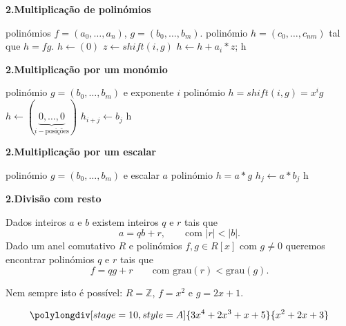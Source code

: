 \documentclass[handout]{beamer}
\newcommand{\ZZ}{\mathbb Z}
\newcommand{\grau}[1]{\mathrm{grau}({#1})}
\begin{document}
\begin{frame}[fragile]{\bf 2.}{\bf Multiplicação de polinómios}
\begin{algorithmic}
\REQUIRE polinómios $f=(a_0,\ldots, a_n)$, $g=(b_0,\ldots, b_m)$.
\ENSURE polinómio $h=(c_0, \ldots, c_{nm})$ tal que $h=fg$.
\STATE $h \leftarrow (0)$ 
  \STATE $z \leftarrow shift(i,g)$
  \STATE $h \leftarrow h + a_i*z$;
\ENDFOR
\RETURN h
\end{algorithmic}

\end{frame}

\begin{frame}[fragile]{\bf 2.}{\bf Multiplicação por um monómio}
\begin{algorithmic}
\REQUIRE polinómio $g=(b_0,\ldots, b_m)$ e exponente $i$
\ENSURE polinómio $h=shift(i,g) = x^ig$
\STATE $h \leftarrow (\underbrace{0,\ldots, 0}_{i-\mbox{posições}})$ 
  \STATE $h_{i+j} \leftarrow b_j$
\ENDFOR
\RETURN h
\end{algorithmic}

\end{frame}

\begin{frame}[fragile]{\bf 2.}{\bf Multiplicação por um escalar}
\begin{algorithmic}
\REQUIRE polinómio $g=(b_0,\ldots, b_m)$ e escalar $a$
\ENSURE polinómio $h=a*g$
  \STATE $h_j \leftarrow a*b_j$
\ENDFOR
\RETURN h
\end{algorithmic}

\end{frame}



\begin{frame}{\bf 2.}{\bf Divisão com resto}
\begin{block}{}
Dados inteiros $a$ e $b$ existem inteiros $q$ e $r$ tais que 
$$ a = qb + r, \qquad \mbox{com } |r|<|b|.$$
\pause Dado um anel comutativo $R$ e polinómios $f,g\in R[x]$ com $g\neq 0$ queremos encontrar polinómios $q$ e $r$ tais que 
$$ f=qg+r \qquad \mbox{com } \grau{r}<\grau{g}.$$
\end{block}
\pause
Nem sempre isto é possível: $R=\ZZ$, $f=x^2$ e $g=2x+1$.
\end{frame}


\begin{frame}
$$\polylongdiv[stage=10,style=A]{3x^4+2x^3+x+5}{x^2+2x+3}$$
\end{frame}
\end{document}
